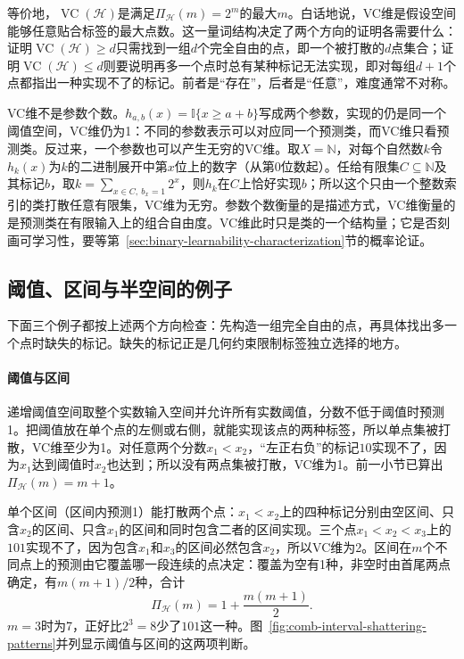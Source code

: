 等价地，$\operatorname{VC}(\mathcal H)$是满足$\Pi_{\mathcal H}(m)=2^m$的最大$m$。白话地说，VC维是假设空间能够任意贴合标签的最大点数。这一量词结构决定了两个方向的证明各需要什么：证明$\operatorname{VC}(\mathcal H)\geq d$只需找到一组$d$个完全自由的点，即一个被打散的$d$点集合；证明$\operatorname{VC}(\mathcal H)\leq d$则要说明再多一个点时总有某种标记无法实现，即对每组$d+1$个点都指出一种实现不了的标记。前者是“存在”，后者是“任意”，难度通常不对称。

VC维不是参数个数。$h_{a,b}(x)=\mathbb I\{x\geq a+b\}$写成两个参数，实现的仍是同一个阈值空间，VC维仍为1：不同的参数表示可以对应同一个预测类，而VC维只看预测类。反过来，一个参数也可以产生无穷的VC维。取$X=\mathbb N$，对每个自然数$k$令$h_k(x)$为$k$的二进制展开中第$x$位上的数字（从第0位数起）。任给有限集$C\subseteq\mathbb N$及其标记$b$，取$k=\sum_{x\in C,\ b_x=1}2^x$，则$h_k$在$C$上恰好实现$b$；所以这个只由一个整数索引的类打散任意有限集，VC维为无穷。参数个数衡量的是描述方式，VC维衡量的是预测类在有限输入上的组合自由度。VC维此时只是类的一个结构量；它是否刻画可学习性，要等第~\ref{sec:binary-learnability-characterization}节的概率论证。

\subsection{阈值、区间与半空间的例子}

下面三个例子都按上述两个方向检查：先构造一组完全自由的点，再具体找出多一个点时缺失的标记。缺失的标记正是几何约束限制标签独立选择的地方。

\paragraph{阈值与区间}
递增阈值空间取整个实数输入空间并允许所有实数阈值，分数不低于阈值时预测1。把阈值放在单个点的左侧或右侧，就能实现该点的两种标签，所以单点集被打散，VC维至少为1。对任意两个分数$x_1<x_2$，“左正右负”的标记$10$实现不了，因为$x_1$达到阈值时$x_2$也达到；所以没有两点集被打散，VC维为1。前一小节已算出$\Pi_{\mathcal H}(m)=m+1$。

单个区间（区间内预测1）能打散两个点：$x_1<x_2$上的四种标记分别由空区间、只含$x_2$的区间、只含$x_1$的区间和同时包含二者的区间实现。三个点$x_1<x_2<x_3$上的$101$实现不了，因为包含$x_1$和$x_3$的区间必然包含$x_2$，所以VC维为2。区间在$m$个不同点上的预测由它覆盖哪一段连续的点决定：覆盖为空有1种，非空时由首尾两点确定，有$m(m+1)/2$种，合计
\[
 \Pi_{\mathcal H}(m)=1+\frac{m(m+1)}2.
\]
$m=3$时为7，正好比$2^3=8$少了$101$这一种。图~\ref{fig:comb-interval-shattering-patterns}并列显示阈值与区间的这两项判断。

